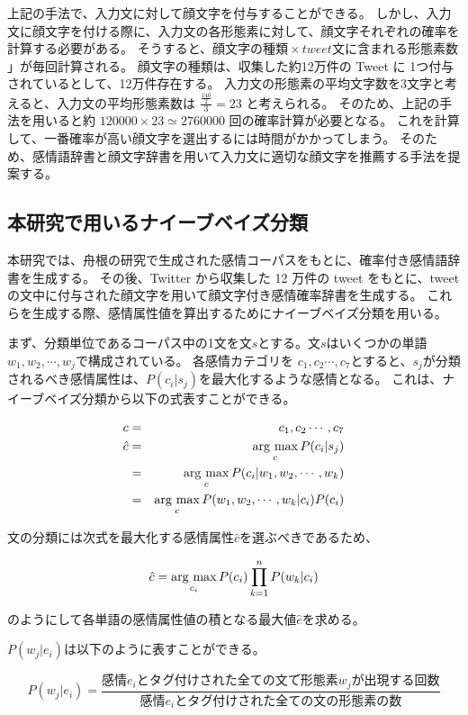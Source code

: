 \documentclass[11pt,a4j]{jsarticle}
\newcommand{\argmax}{\mathop{\rm arg~max}\limits}
\begin{document}
上記の手法で、入力文に対して顔文字を付与することができる。
しかし、入力文に顔文字を付ける際に、入力文の各形態素に対して、顔文字それぞれの確率を計算する必要がある。
そうすると、$顔文字の種類 \times \mathit{tweet}文に含まれる形態素数$」が毎回計算される。
顔文字の種類は、収集した約12万件の Tweet に 1つ付与されているとして、12万件存在する。
入力文の形態素の平均文字数を3文字と考えると、入力文の平均形態素数は $\frac{\frac{140}{2}}{3}=23$ と考えられる。
そのため、上記の手法を用いると約 $120000 \times 23 \simeq 2760000$ 回の確率計算が必要となる。
これを計算して、一番確率が高い顔文字を選出するには時間がかかってしまう。
そのため、感情語辞書と顔文字辞書を用いて入力文に適切な顔文字を推薦する手法を提案する。

  \subsection{本研究で用いるナイーブベイズ分類}\label{sec:thesisnaivebayes}
本研究では、舟根の研究で生成された感情コーパスをもとに、確率付き感情語辞書を生成する。
その後、Twitter から収集した 12 万件の tweet をもとに、tweet の文中に付与された顔文字を用いて顔文字付き感情確率辞書を生成する。
これらを生成する際、感情属性値を算出するためにナイーブベイズ分類を用いる。

まず、分類単位であるコーパス中の1文を文$s$とする。文$s$はいくつかの単語$w_1,w_2, \cdots ,w_j$で構成されている。
各感情カテゴリを $c_1,c_2 \cdots ,c_7$とすると、$s_j$が分類されるべき感情属性は、$P(c_i|s_j)$を最大化するような感情となる。
これは、ナイーブベイズ分類から以下の式表すことができる。

\begin{eqnarray*}
c & = & {c_1,c_2 \cdots ,c_7}\\
\hat{c} & = & \argmax_{c} P(c_i|s_j) \\
        & = & \argmax_{c} P(c_i|w_1,w_2,\cdots ,w_k) \\
        & = & \argmax_{c} P(w_1,w_2,\cdots ,w_k|c_i)P(c_i) \\
\end{eqnarray*}

文の分類には次式を最大化する感情属性$\hat{c}$を選ぶべきであるため、

\[
\hat{c}=\argmax_{c_i} P(c_i)\prod_{k=1}^n P(w_k|c_i)
\]

のようにして各単語の感情属性値の積となる最大値$\hat{e}$を求める。

$P(w_j|e_i)$は以下のように表すことができる。

\[
P(w_j|e_i)=\frac{感情 e_i とタグ付けされた全ての文で形態素 w_j が出現する回数}{感情 e_i とタグ付けされた全ての文の形態素の数}
\]
\end{document}
